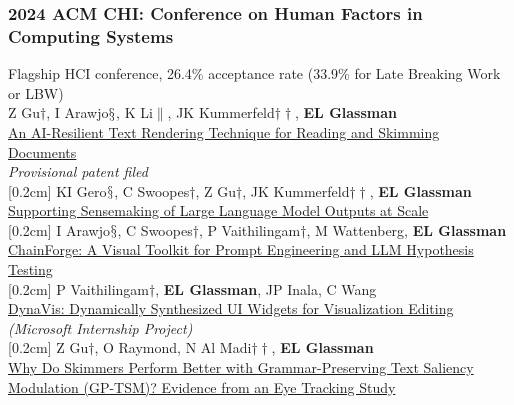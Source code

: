 \documentclass[10pt, a4paper]{article}
\newcommand{\years}[1]{\marginnote{\normalsize #1}}
\begin{document}

\subsubsection*{2024 ACM \textbf{CHI}: Conference on Human Factors in Computing Systems}
Flagship HCI conference, 26.4\% acceptance rate (33.9\% for Late Breaking Work or LBW)\\

\years{\textbf{C35}} Z Gu$\dagger$, I Arawjo$\mathsection$, K Li$\|$, JK Kummerfeld$\dagger\dagger$, \textbf{EL Glassman}\\ \href{https://glassmanlab.seas.harvard.edu/papers/gptsm.pdf}{An AI-Resilient Text Rendering Technique for Reading and Skimming Documents}\\
\textit{Provisional patent filed}\\
[0.2cm]
\years{\textbf{C34}} KI Gero$\mathsection$, C Swoopes$\dagger$, Z Gu$\dagger$, JK Kummerfeld$\dagger\dagger$, \textbf{EL Glassman}\\ \href{https://glassmanlab.seas.harvard.edu/papers/mesotext.pdf}{Supporting Sensemaking of Large Language Model Outputs at Scale}\\
[0.2cm]
\years{\textbf{C33}} I Arawjo$\mathsection$, C Swoopes$\dagger$, P Vaithilingam$\dagger$, M Wattenberg, \textbf{EL Glassman}\\ \href{https://glassmanlab.seas.harvard.edu/papers/chainforge.pdf}{ChainForge: A Visual Toolkit for Prompt Engineering and LLM Hypothesis Testing}\\
[0.2cm]
\years{\textbf{C32}} P Vaithilingam$\dagger$, \textbf{EL Glassman}, JP Inala, C Wang\\ \href{https://glassmanlab.seas.harvard.edu/papers/dynavis.pdf}{DynaVis: Dynamically Synthesized UI Widgets for Visualization Editing}\\
\textit{(Microsoft Internship Project)}\\
[0.2cm]
\years{\textbf{C31} LBW}Z Gu$\dagger$, O Raymond, N Al Madi$\dagger\dagger$, \textbf{EL Glassman}\\
\href{https://glassmanlab.seas.harvard.edu/papers/gptsm_eye_lbw.pdf}{Why Do Skimmers Perform Better with Grammar-Preserving Text Saliency Modulation (GP-TSM)? Evidence from an Eye Tracking Study}
\end{document}

